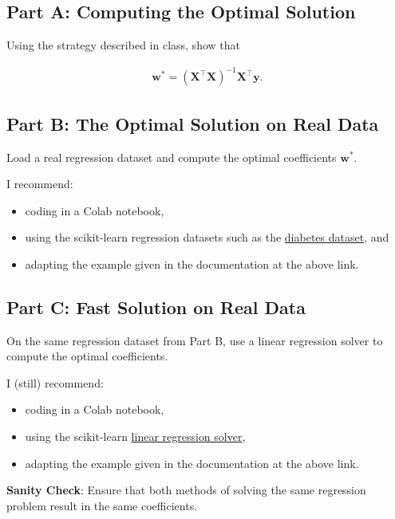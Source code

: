 \documentclass{article}
\begin{document}
\subsection*{Part A: Computing the Optimal Solution}

Using the strategy described in class, show that

\begin{align}
    \mathbf{w}^* = (\mathbf{X^\top X})^{-1} \mathbf{X^\top y}.
\end{align}


\subsection*{Part B: The Optimal Solution on Real Data}

Load a real regression dataset and compute the optimal coefficients $\mathbf{w}^*$.

I recommend:
\begin{itemize}
    \item coding in a Colab notebook,
    \item using the scikit-learn regression datasets such as the \href{https://scikit-learn.org/1.5/modules/generated/sklearn.datasets.load_diabetes.html#sklearn.datasets.load_diabetes}{diabetes dataset}, and
    \item adapting the example given in the documentation at the above link.
\end{itemize}

\subsection*{Part C: Fast Solution on Real Data}

On the same regression dataset from Part B, use a linear regression solver to compute the optimal coefficients.

I (still) recommend:
\begin{itemize}
    \item coding in a Colab notebook,
    \item using the scikit-learn \href{https://scikit-learn.org/1.5/modules/generated/sklearn.linear_model.LinearRegression.html}{linear regression solver},
    \item adapting the example given in the documentation at the above link.
\end{itemize}

\noindent
\textbf{Sanity Check}: Ensure that both methods of solving the same regression problem result in the same coefficients.

%
\end{document}
